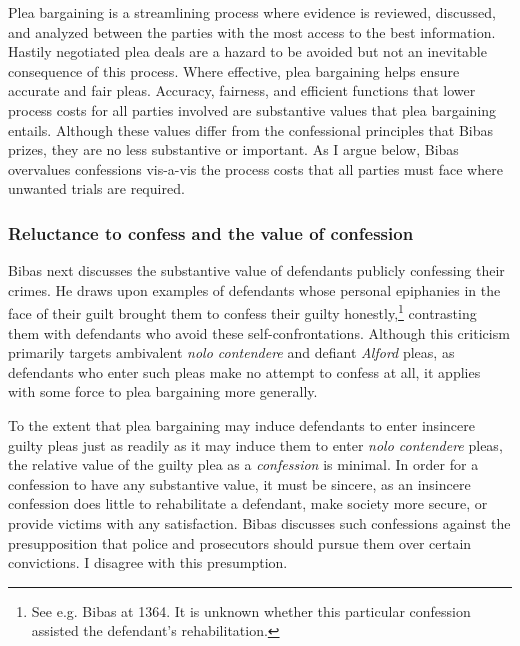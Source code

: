 Plea bargaining is a streamlining process where evidence is reviewed, discussed, and analyzed between the parties with the most access to the best information. Hastily negotiated plea deals are a hazard to be avoided but not an inevitable consequence of this process. Where effective, plea bargaining helps ensure accurate and fair pleas. Accuracy, fairness, and efficient functions that lower process costs for all parties involved are substantive values that plea bargaining entails. Although these values differ from the confessional principles that Bibas prizes, they are no less substantive or important. As I argue below, Bibas overvalues confessions vis-a-vis the process costs that all parties must face where unwanted trials are required.

\subsubsection{Reluctance to confess and the value of confession}

Bibas next discusses the substantive value of defendants publicly confessing their crimes. He draws upon examples of defendants whose personal epiphanies in the face of their guilt brought them to confess their guilty honestly,\footnote{See e.g. Bibas at 1364. It is unknown whether this particular confession assisted the defendant's rehabilitation.} contrasting them with defendants who avoid these self-confrontations. Although this criticism primarily targets ambivalent \textit{nolo contendere} and defiant \textit{Alford} pleas, as defendants who enter such pleas make no attempt to confess at all, it applies with some force to plea bargaining more generally. 

To the extent that plea bargaining may induce defendants to enter insincere guilty pleas just as readily as it may induce them to enter \textit{nolo contendere} pleas, the relative value of the guilty plea as a \textit{confession} is minimal. In order for a confession to have any substantive value, it must be sincere, as an insincere confession does little to rehabilitate a defendant, make society more secure, or provide victims with any satisfaction. Bibas discusses such confessions against the presupposition that police and prosecutors should pursue them over certain convictions. I disagree with this presumption. 


